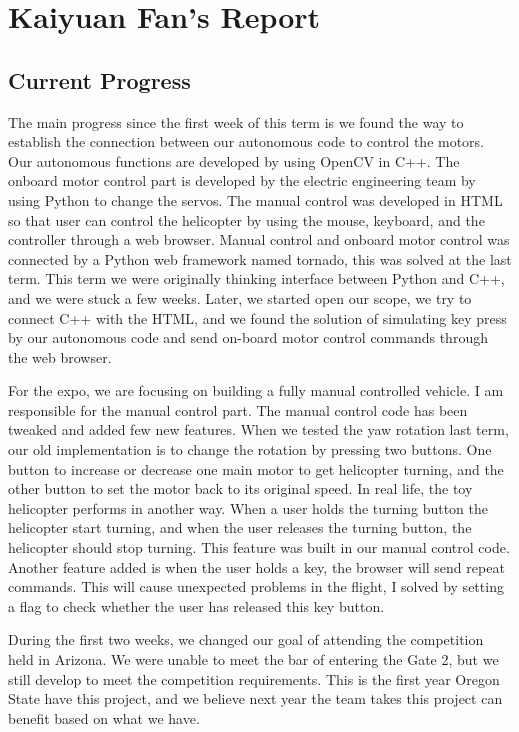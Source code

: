 \documentclass[onecolumn, draftclsnofoot,10pt, compsoc]{IEEEtran}
\begin{document}
\section{Kaiyuan Fan's Report}

\subsection{Current Progress}

The main progress since the first week of this term is we found the way to establish the connection between our autonomous code to control the motors. Our autonomous functions are developed by using OpenCV in C++. The onboard motor control part is developed by the electric engineering team by using Python to change the servos. The manual control was developed in HTML so that user can control the helicopter by using the mouse, keyboard, and the controller through a web browser. Manual control and onboard motor control was connected by a Python web framework named tornado, this was solved at the last term. This term we were originally thinking interface between Python and C++, and we were stuck a few weeks. Later, we started open our scope, we try to connect C++ with the HTML, and we found the solution of simulating key press by our autonomous code and send on-board motor control commands through the web browser.

For the expo, we are focusing on building a fully manual controlled vehicle. I am responsible for the manual control part. The manual control code has been tweaked and added few new features. When we tested the yaw rotation last term, our old implementation is to change the rotation by pressing two buttons. One button to increase or decrease one main motor to get helicopter turning, and the other button to set the motor back to its original speed. In real life, the toy helicopter performs in another way. When a user holds the turning button the helicopter start turning, and when the user releases the turning button, the helicopter should stop turning. This feature was built in our manual control code. Another feature added is when the user holds a key, the browser will send repeat commands. This will cause unexpected problems in the flight, I solved by setting a flag to check whether the user has released this key button.

During the first two weeks, we changed our goal of attending the competition held in Arizona. We were unable to meet the bar of entering the Gate 2, but we still develop to meet the competition requirements. This is the first year Oregon State have this project, and we believe next year the team takes this project can benefit based on what we have.
\end{document}
